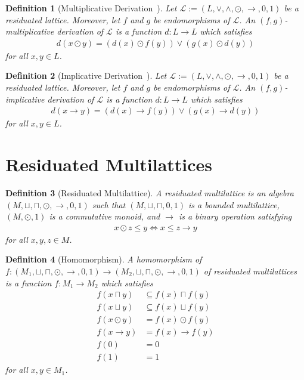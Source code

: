 \documentclass{article}
\newtheorem{definition}{Definition}
\begin{document}
\begin{definition}[Multiplicative Derivation~\cite{YFAL20}]
Let $\mathcal{L} := (L,\vee,\wedge,\odot,\rightarrow,0,1)$ be a residuated lattice. Moreover, let $f$ and $g$ be endomorphisms of $\mathcal{L}$.
An \emph{$(f,g)$-multiplicative derivation} of $\mathcal{L}$ is a function $d:L \rightarrow L$ which satisfies
\begin{align}
d(x \odot y) = (d(x) \odot f(y)) \vee (g(x) \odot d(y))
\end{align}
for all $x,y \in L$.
\end{definition}

\begin{definition}[Implicative Derivation~\cite{YFAL20}]
Let $\mathcal{L} := (L,\vee,\wedge,\odot,\rightarrow,0,1)$ be a residuated lattice. Moreover, let $f$ and $g$ be endomorphisms of $\mathcal{L}$.
An \emph{$(f,g)$-implicative derivation} of $\mathcal{L}$ is a function $d:L \rightarrow L$ which satisfies
\begin{align}
d(x \rightarrow y) = (d(x) \rightarrow f(y)) \vee (g(x) \rightarrow d(y))
\end{align}
for all $x,y \in L$.
\end{definition}

\section{Residuated Multilattices}
\label{remu0}
\begin{definition}[Residuated Multilattice]
A \emph{residuated multilattice} is an algebra $(M,\sqcup,\sqcap,\odot,\rightarrow,0,1)$ such that $(M,\sqcup,\sqcap,0,1)$ is a bounded multilattice,
$(M,\odot,1)$ is a commutative monoid, and $\rightarrow$ is a binary operation satisfying
\begin{align}
x \odot z \leq y \Leftrightarrow x \leq z \rightarrow y
\end{align}
for all $x,y,z \in M$.
\end{definition}

\begin{definition}[Homomorphism]
A \emph{homomorphism} of $f:(M_1,\sqcup,\sqcap,\odot,\rightarrow,0,1) \rightarrow (M_2,\sqcup,\sqcap,\odot,\rightarrow,0,1)$ of residuated multilattices
is a function $f:M_1 \rightarrow M_2$ which satisfies
\begin{align}
f(x \sqcap y) &\subseteq f(x) \sqcap f(y) \\
f(x \sqcup y) &\subseteq f(x) \sqcup f(y) \\
f(x \odot y) &= f(x) \odot f(y) \\
f(x \rightarrow y) &= f(x) \rightarrow f(y) \\
f(0) &= 0 \\
f(1) &= 1
\end{align}
for all $x,y \in M_1$.
\end{definition}
\end{document}
